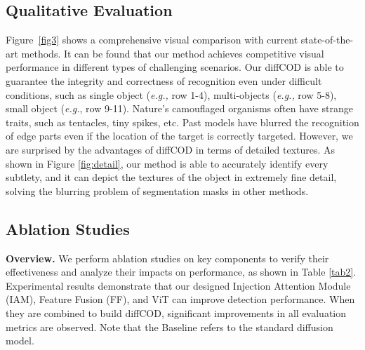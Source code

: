 \documentclass{ecai}
\begin{document}
\subsection{Qualitative Evaluation}
Figure~\ref{fig3} shows a comprehensive visual comparison with current state-of-the-art methods. It can be found that our method achieves competitive visual performance in different types of challenging scenarios. Our diffCOD is able to guarantee the integrity and correctness of recognition even under difficult conditions, such as single object (\textit{e.g.,} row 1-4), multi-objects (\textit{e.g.,} row 5-8), small object (\textit{e.g.}, row 9-11). Nature's camouflaged organisms often have strange traits, such as tentacles, tiny spikes, etc. Past models have blurred the recognition of edge parts even if the location of the target is correctly targeted. However, we are surprised by the advantages of diffCOD in terms of detailed textures. As shown in Figure \ref{fig:detail}, our method is able to accurately identify every subtlety, and it can depict the textures of the object in extremely fine detail, solving the blurring problem of segmentation masks in other methods.











\subsection{Ablation Studies}
\noindent\textbf{Overview.}
We perform ablation studies on key components to verify their effectiveness and analyze their impacts on performance, as shown in Table \ref{tab2}. Experimental results demonstrate that our designed Injection Attention Module (IAM), Feature Fusion (FF), and ViT can improve detection performance. When they are combined to build diffCOD, significant improvements in all evaluation metrics are observed. Note that the Baseline refers to the standard diffusion model.
\end{document}
